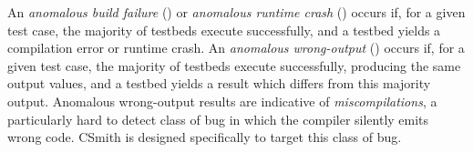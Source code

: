 An \emph{anomalous build failure} (\abf) or \emph{anomalous runtime crash} (\arc) occurs if, for a given test case, the majority of testbeds execute successfully, and a testbed yields a compilation error or runtime crash.
An \emph{anomalous wrong-output} (\awo) occurs if, for a given test case, the majority of testbeds execute successfully, producing the same output values, and a testbed yields a result which differs from this majority output. Anomalous wrong-output results are indicative of \emph{miscompilations}, a particularly hard to detect class of bug in which the compiler silently emits wrong code. CSmith is designed specifically to target this class of bug.


%





